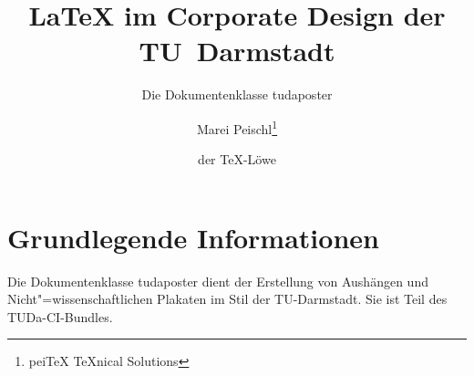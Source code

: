 \documentclass[
	german,%
	paper=a0,%
	accentcolor=9c,%
	logo=body,%
	footer=true,
]{tudaposter}
\begin{document}
\title{\LaTeX{} im Corporate Design der TU~Darmstadt}
\subtitle{Die Dokumentenklasse tudaposter}
\author{Marei Peischl\thanks{pei\TeX{} \TeX{}nical Solutions}\and der \TeX-Löwe}

\titlegraphic{\color{red!20}\rule{\contentwidth}{.3\contentheight}}


\maketitle

\section*{Grundlegende Informationen}

Die Dokumentenklasse tudaposter dient der Erstellung von Aushängen und Nicht"=wissenschaftlichen Plakaten im Stil der TU-Darmstadt. Sie ist Teil des TUDa-CI-Bundles.
\end{document}
